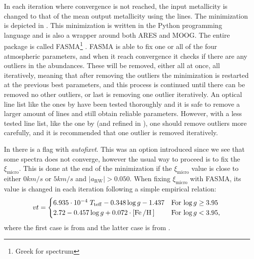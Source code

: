 In each iteration where convergence is not reached, the input metallicity is
changed to that of the mean output metallicity using the  lines. The
minimization is depicted in . This minimization is
written in the Python programming language and is also a wrapper around both
ARES and MOOG. The entire package is called FASMA\footnote{Greek for spectrum}
\citep{Andreasen2017a, Tsantaki2017}. FASMA is able to fix one or all of the
four atmospheric parameters, and when it reach convergence it checks if there
are any outliers in the abundances. These will be removed, either all at once,
all iteratively, meaning that after removing the outliers the minimization is
restarted at the previous best parameters, and this process is continued until
there can be removed no other outliers, or last is removing one outlier
iteratively. An optical line list like the ones by
\citet{Sousa2008a,Tsantaki2013} have been tested thoroughly and it is safe to
remove a larger amount of lines and still obtain reliable parameters. However,
with a less tested line list, like the one by \citet{Andreasen2016} (and refined
in \citet{Andreasen2017b}), one should remove outliers more carefully, and it is
recommended that one outlier is removed iteratively.

In  there is a flag with \emph{autofixvt}. This was an
option introduced since we see that some spectra does not converge, however the
usual way to proceed is to fix the $\xi_\mathrm{micro}$. This is done at the end
of the minimization if the $\xi_\mathrm{micro}$ value is close to either
$0\si{km/s}$ or $5\si{km/s}$ and $|a_\mathrm{RW}| > 0.050$. When fixing
$\xi_\mathrm{micro}$ with FASMA, its value is changed in each iteration
following a simple empirical relation:
\begin{align}
  vt = \begin{cases}
    6.935 \cdot 10^{-4}\; T_\mathrm{teff} - 0.348 \log g - 1.437     & \text{For $\log g \ge 3.95$} \\
    2.72 - 0.457 \log g + 0.072 \cdot [\ion{Fe}/\ion{H}]             & \text{For $\log g < 3.95$},
\end{cases}
\end{align}
where the first case is from \citet{Tsantaki2013} and the latter case is from
\citet{Adibekyan2015}.

